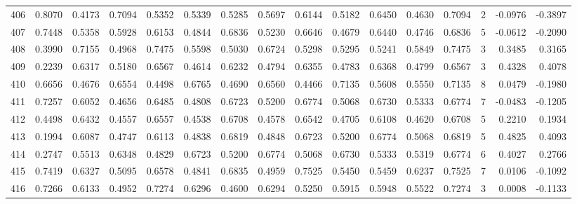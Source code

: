 \begin{tabular}{lrrrrrrrrrrrrrrr}
406 &      0.8070 &  0.4173 &  0.7094 &  0.5352 &  0.5339 &  0.5285 &  0.5697 &  0.6144 &  0.5182 &  0.6450 &   0.4630 &     0.7094 &      2 &                   -0.0976 &                    -0.3897 \\
407 &      0.7448 &  0.5358 &  0.5928 &  0.6153 &  0.4844 &  0.6836 &  0.5230 &  0.6646 &  0.4679 &  0.6440 &   0.4746 &     0.6836 &      5 &                   -0.0612 &                    -0.2090 \\
408 &      0.3990 &  0.7155 &  0.4968 &  0.7475 &  0.5598 &  0.5030 &  0.6724 &  0.5298 &  0.5295 &  0.5241 &   0.5849 &     0.7475 &      3 &                    0.3485 &                     0.3165 \\
409 &      0.2239 &  0.6317 &  0.5180 &  0.6567 &  0.4614 &  0.6232 &  0.4794 &  0.6355 &  0.4783 &  0.6368 &   0.4799 &     0.6567 &      3 &                    0.4328 &                     0.4078 \\
410 &      0.6656 &  0.4676 &  0.6554 &  0.4498 &  0.6765 &  0.4690 &  0.6560 &  0.4466 &  0.7135 &  0.5608 &   0.5550 &     0.7135 &      8 &                    0.0479 &                    -0.1980 \\
411 &      0.7257 &  0.6052 &  0.4656 &  0.6485 &  0.4808 &  0.6723 &  0.5200 &  0.6774 &  0.5068 &  0.6730 &   0.5333 &     0.6774 &      7 &                   -0.0483 &                    -0.1205 \\
412 &      0.4498 &  0.6432 &  0.4557 &  0.6557 &  0.4538 &  0.6708 &  0.4578 &  0.6542 &  0.4705 &  0.6108 &   0.4620 &     0.6708 &      5 &                    0.2210 &                     0.1934 \\
413 &      0.1994 &  0.6087 &  0.4747 &  0.6113 &  0.4838 &  0.6819 &  0.4848 &  0.6723 &  0.5200 &  0.6774 &   0.5068 &     0.6819 &      5 &                    0.4825 &                     0.4093 \\
414 &      0.2747 &  0.5513 &  0.6348 &  0.4829 &  0.6723 &  0.5200 &  0.6774 &  0.5068 &  0.6730 &  0.5333 &   0.5319 &     0.6774 &      6 &                    0.4027 &                     0.2766 \\
415 &      0.7419 &  0.6327 &  0.5095 &  0.6578 &  0.4841 &  0.6835 &  0.4959 &  0.7525 &  0.5450 &  0.5459 &   0.6237 &     0.7525 &      7 &                    0.0106 &                    -0.1092 \\
416 &      0.7266 &  0.6133 &  0.4952 &  0.7274 &  0.6296 &  0.4600 &  0.6294 &  0.5250 &  0.5915 &  0.5948 &   0.5522 &     0.7274 &      3 &                    0.0008 &                    -0.1133 \\

\end{tabular}
